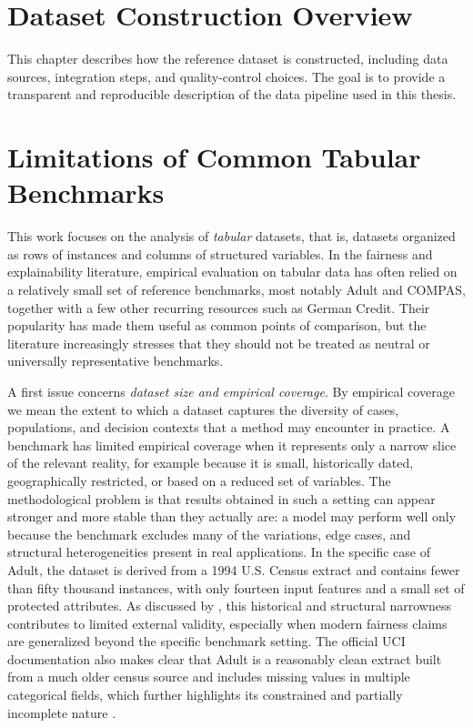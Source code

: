 
\section{Dataset Construction Overview}
This chapter describes how the reference dataset is constructed, including data sources, integration steps, and quality-control choices. The goal is to provide a transparent and reproducible description of the data pipeline used in this thesis.

\section{Limitations of Common Tabular Benchmarks}
\label{sec:benchmark-limitations}

This work focuses on the analysis of \emph{tabular} datasets, that is, datasets organized as rows of instances and columns of structured variables. In the fairness and explainability literature, empirical evaluation on tabular data has often relied on a relatively small set of reference benchmarks, most notably Adult and COMPAS, together with a few other recurring resources such as German Credit. Their popularity has made them useful as common points of comparison, but the literature increasingly stresses that they should not be treated as neutral or universally representative benchmarks.

A first issue concerns \emph{dataset size and empirical coverage}. By empirical coverage we mean the extent to which a dataset captures the diversity of cases, populations, and decision contexts that a method may encounter in practice. A benchmark has limited empirical coverage when it represents only a narrow slice of the relevant reality, for example because it is small, historically dated, geographically restricted, or based on a reduced set of variables. The methodological problem is that results obtained in such a setting can appear stronger and more stable than they actually are: a model may perform well only because the benchmark excludes many of the variations, edge cases, and structural heterogeneities present in real applications. In the specific case of Adult, the dataset is derived from a 1994 U.S. Census extract and contains fewer than fifty thousand instances, with only fourteen input features and a small set of protected attributes. As discussed by \textcite{ding2021retiring}, this historical and structural narrowness contributes to limited external validity, especially when modern fairness claims are generalized beyond the specific benchmark setting. The official UCI documentation also makes clear that Adult is a reasonably clean extract built from a much older census source and includes missing values in multiple categorical fields, which further highlights its constrained and partially incomplete nature \cite{kohavi1996adult}.

